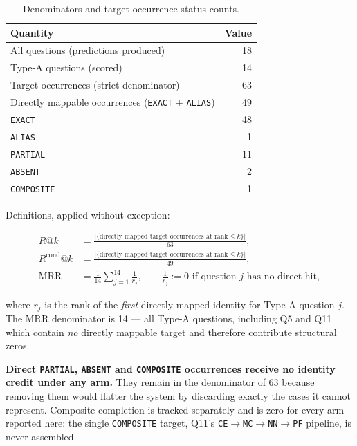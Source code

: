 \documentclass[11pt,a4paper]{article}
\begin{document}
\begin{table}[htbp]
\centering
\caption{Denominators and target-occurrence status counts.}
\label{tab:denom}
\begin{tabular}{lr}
\toprule
Quantity & Value \\
\midrule
All questions (predictions produced) & 18 \\
Type-A questions (scored) & 14 \\
Target occurrences (strict denominator) & 63 \\
Directly mappable occurrences (\texttt{EXACT} $+$ \texttt{ALIAS}) & 49 \\
\quad \texttt{EXACT} & 48 \\
\quad \texttt{ALIAS} & 1 \\
\texttt{PARTIAL} & 11 \\
\texttt{ABSENT} & 2 \\
\texttt{COMPOSITE} & 1 \\
\bottomrule
\end{tabular}
\end{table}

Definitions, applied without exception:

\begin{align}
R@k &= \frac{\lvert\{\text{directly mapped target occurrences at rank} \le k\}\rvert}{63}, \\[4pt]
R^{\text{cond}}@k &= \frac{\lvert\{\text{directly mapped target occurrences at rank} \le k\}\rvert}{49}, \\[4pt]
\mathrm{MRR} &= \frac{1}{14}\sum_{j=1}^{14} \frac{1}{r_j}, \qquad \frac{1}{r_j} := 0 \text{ if question } j \text{ has no direct hit},
\end{align}

where $r_j$ is the rank of the \emph{first} directly mapped identity for Type-A question $j$. The MRR
denominator is 14 --- all Type-A questions, including Q5 and Q11 which contain \emph{no} directly mappable
target and therefore contribute structural zeros.

\textbf{Direct \texttt{PARTIAL}, \texttt{ABSENT} and \texttt{COMPOSITE} occurrences receive no identity
credit under any arm.} They remain in the denominator of 63 because removing them would flatter the system
by discarding exactly the cases it cannot represent. Composite completion is tracked separately and is zero
for every arm reported here: the single \texttt{COMPOSITE} target, Q11's
\texttt{CE}$\rightarrow$\allowbreak\texttt{MC}$\rightarrow$\allowbreak\texttt{NN}$\rightarrow$\allowbreak\texttt{PF} pipeline, is never
assembled.
\end{document}
